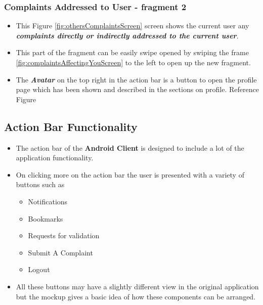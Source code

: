 \documentclass[12pt]{article}
\begin{document}
    \subsubsection{Complaints Addressed to User - fragment 2}
    \par 
    \begin{itemize} 
    \item This Figure \ref{fig:othersComplaintsScreen} screen shows the current user any \textbf{\textit{complaints directly or indirectly addressed to the current user}}.
    \item This part of the fragment can be easily swipe opened by swiping the frame \ref{fig:complaintsAffectingYouScreen} to the left to open up the new fragment.
    \item The \textbf{\textit{Avatar}} on the top right in the action bar is a button to open the profile page which has been shown and described in the sections on profile. Reference Figure %
    \end{itemize}
    
    
    
    
      
    \subsection{Action Bar Functionality}
     \par 
    \begin{itemize} 
    \item The action bar of the \textbf{Android Client} is designed to include a lot of the application functionality.        

    \item On clicking more on the action bar the user is presented with a variety of buttons such as
      \begin{itemize}
      \item Notifications
            \item Bookmarks
            \item Requests for validation
            \item Submit A Complaint
            \item Logout            
      \end{itemize}
    \item All these buttons may have a slightly different view in the original application but the mockup gives a basic idea of how these components can be arranged.
    \end{itemize}
    
\end{document}
